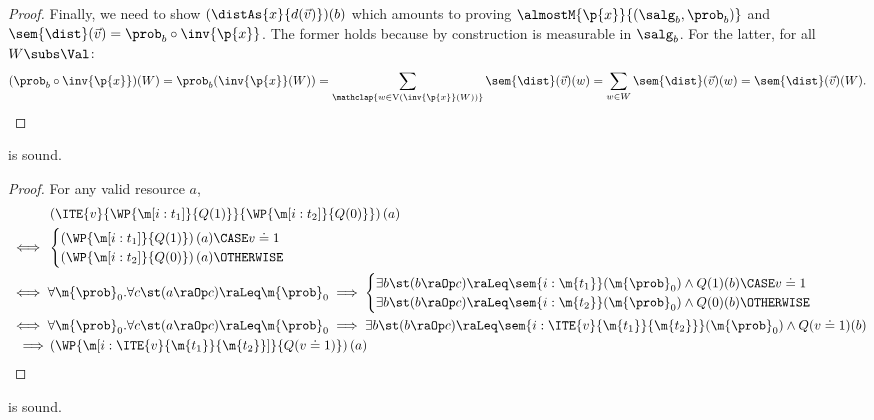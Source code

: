 \begin{proof}
  Finally, we need to show $ (\distAs{x}{d(\vec{v})})(b) $
  which amounts to proving
  $\almostM{\p{x}}{(\salg_b,\prob_b)}$
  and
  $\sem{\dist}(\vec{v}) = \prob_b \circ \inv{\p{x}}$.
  The former holds because by construction  is measurable in $\salg_b$.
  For the latter, for all $W \subs \Val$:
  \[
    (\prob_b \circ \inv{\p{x}})(W)
    =
    \prob_b (\inv{\p{x}}(W))
    =
    \sum_{\mathclap{w \in \valOf(\inv{\p{x}}(W))}}
      \sem{\dist}(\vec{v})(w)
    =
    \sum_{w \in W}
      \sem{\dist}(\vec{v})(w)
    =
    \sem{\dist}(\vec{v})(W).
    \qedhere
  \]
\end{proof}
 \begin{lemma}
\label{proof:wp-if-prim}
   is sound.
\end{lemma}

\begin{proof}
  For any valid resource $a$,
  \begin{align*}
    & \left(\ITE{v}{\WP{\m[i: t_1]}{Q(1)}}{\WP{\m[i: t_2]}{Q(0)}}\right)(a)\\
    {}\iff {} &
    \begin{cases}
      \left(\WP{\m[i: t_1]}{Q(1)}\right)(a) \CASE v \doteq 1 \\
      \left(\WP{\m[i: t_2]}{Q(0)}\right)(a)\OTHERWISE \\
    \end{cases} \\
    {}\iff {}&
  \forall \m{\prob}_0.
    \forall c \st
    (a \raOp c) \raLeq \m{\prob}_0
    \implies
      \begin{cases}
          \exists b \st (b \raOp c) \raLeq \sem{i: \m{t_1}}(\m{\prob}_0)
      \land Q(1)(b)
      \CASE v \doteq 1 \\
          \exists b \st (b \raOp c) \raLeq \sem{i: \m{t_2}}(\m{\prob}_0)
      \land Q(0)(b)
      \OTHERWISE
      \end{cases} \\
    {}\iff {} &
    \forall \m{\prob}_0.
    \forall c \st
    (a \raOp c) \raLeq \m{\prob}_0
    {}\implies {}
    \exists b \st (b \raOp c) \raLeq \sem{i: \ITE{v}{\m{t_1}}{\m{t_2}}}(\m{\prob}_0)
      \land  Q(v \doteq 1)(b) \\
    \implies &  \left(\WP{\m[i: \ITE{v}{\m{t_1}}{\m{t_2}}]}{Q(v \doteq 1)}\right)(a)
  \end{align*}
\end{proof} \begin{lemma}
\label{proof:wp-bind}
   is sound.
\end{lemma}

